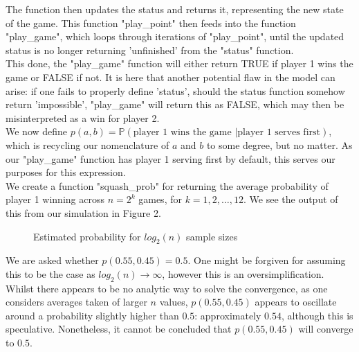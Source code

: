 \documentclass[a4paper, 11pt, oneside]{article}
\begin{document}
The function then updates the status and returns it, representing the new state of the game. This function "play\_point" then feeds into the function "play\_game", which loops through iterations of "play\_point", until the updated status is no longer returning 'unfinished' from the "status" function.  \\

This done, the "play\_game" function will either return TRUE if player 1 wins the game or FALSE if not. It is here that another potential flaw in the model can arise: if one fails to properly define 'status', should the status function somehow return 'impossible', "play\_game" will return this as FALSE, which may then be misinterpreted as a win for player 2.\\

We now define $p(a,b) = \mathbb{P}(\text{player 1 wins the game } | \text{player 1 serves first})$, which is recycling our nomenclature of $a$ and $b$ to some degree, but no matter.  As our "play\_game" function has player 1 serving first by default, this serves our purposes for this expression.  \\

We create a function "squash\_prob" for returning the average probability of player 1 winning across $n = 2^k$ games, for $k = 1,2,\dots, 12$.  We see the output of this from our simulation in Figure 2.\\

\begin{figure}[h]
\centering
{}
\caption{Estimated probability for $log_2(n)$ sample sizes}
\centering
\end{figure}

We are asked whether $p(0.55,0.45) = 0.5$.  One might be forgiven for assuming this to be the case as $log_2(n) \rightarrow \infty$, however this is an oversimplification.  Whilst there appears to be no analytic way to solve the convergence, as one considers averages taken of larger $n$ values, $p(0.55,0.45)$ appears to oscillate around a probability slightly higher than $0.5$: approximately $0.54$, although this is speculative.  Nonetheless, it cannot be concluded that $p(0.55,0.45)$ will converge to $0.5$.
\end{document}
